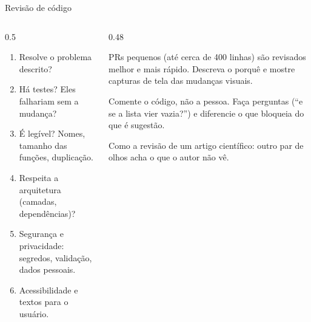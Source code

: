 \documentclass[aspectratio=169,10pt]{beamer}
\begin{document}
\begin{frame}{Revisão de código}
  \begin{columns}[T]
    \begin{column}{0.5\textwidth}
      \begin{conceito}
        \begin{enumerate}
          \item Resolve o problema descrito?
          \item Há testes? Eles falhariam sem a mudança?
          \item É legível? Nomes, tamanho das funções, duplicação.
          \item Respeita a arquitetura (camadas, dependências)?
          \item Segurança e privacidade: segredos, validação, dados pessoais.
          \item Acessibilidade e textos para o usuário.
        \end{enumerate}
      \end{conceito}
    \end{column}
    \begin{column}{0.48\textwidth}
      \begin{dica}
        PRs pequenos (até cerca de 400 linhas) são revisados melhor e mais rápido. Descreva o porquê e mostre capturas de tela das mudanças visuais.
      \end{dica}
      \begin{dica}
        Comente o código, não a pessoa. Faça perguntas (``e se a lista vier vazia?'') e diferencie o que bloqueia do que é sugestão.
      \end{dica}
      \begin{analogia}
        Como a revisão de um artigo científico: outro par de olhos acha o que o autor não vê.
      \end{analogia}
    \end{column}
  \end{columns}
\end{frame}
\end{document}
